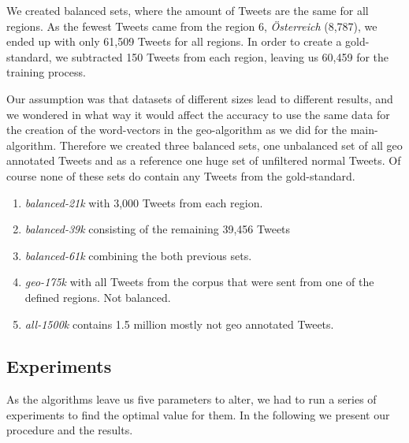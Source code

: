\documentclass[./Main.tex]{subfiles}
\begin{document}
We created balanced sets, where the amount of Tweets are the same for all regions. As the fewest Tweets came from the region 6, \textit{Österreich} (8,787), we ended up with only 61,509 Tweets for all regions.  
In order to create a gold-standard, we subtracted 150 Tweets from each region, leaving us 60,459 for the training process.

Our assumption was that datasets of different sizes lead to different results, and we wondered in what way it would affect the accuracy to use the same data for the creation of the word-vectors in the geo-algorithm as we did for the main-algorithm. Therefore we created three balanced sets, one unbalanced set of all geo annotated Tweets and as a reference one huge set of unfiltered normal Tweets. Of course none of these sets do contain any Tweets from the gold-standard.
\begin{enumerate}
\item \emph{balanced-21k} with 3,000 Tweets from each region.
\item \emph{balanced-39k} consisting of the remaining 39,456 Tweets
\item \emph{balanced-61k} combining the both previous sets. 
\item \emph{geo-175k} with all Tweets from the corpus that were sent from one of the defined regions. Not balanced.
\item \emph{all-1500k} contains 1.5 million mostly not geo annotated Tweets.
\end{enumerate}
\subsection{Experiments}
As the algorithms leave us five parameters to alter, we had to run a series of experiments to find the optimal value for them. In the following we present our procedure and the results.
\end{document}
